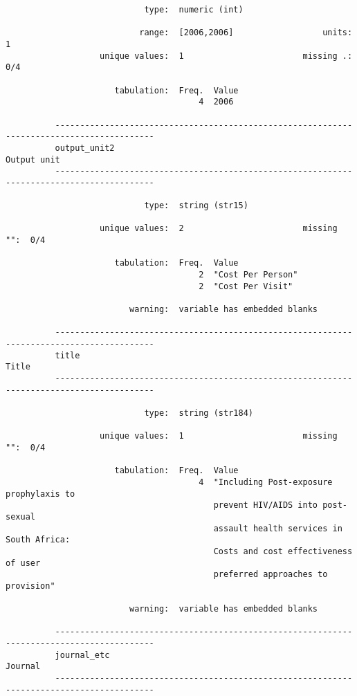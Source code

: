 \documentclass{article}
\begin{document}
\begin{verbatim}
                            type:  numeric (int)
          
                           range:  [2006,2006]                  units:  1
                   unique values:  1                        missing .:  0/4
          
                      tabulation:  Freq.  Value
                                       4  2006
          
          ------------------------------------------------------------------------------------------
          output_unit2                                                                   Output unit
          ------------------------------------------------------------------------------------------
          
                            type:  string (str15)
          
                   unique values:  2                        missing "":  0/4
          
                      tabulation:  Freq.  Value
                                       2  "Cost Per Person"
                                       2  "Cost Per Visit"
          
                         warning:  variable has embedded blanks
          
          ------------------------------------------------------------------------------------------
          title                                                                                Title
          ------------------------------------------------------------------------------------------
          
                            type:  string (str184)
          
                   unique values:  1                        missing "":  0/4
          
                      tabulation:  Freq.  Value
                                       4  "Including Post-exposure prophylaxis to
                                          prevent HIV/AIDS into post-sexual
                                          assault health services in South Africa:
                                          Costs and cost effectiveness of user
                                          preferred approaches to provision"
          
                         warning:  variable has embedded blanks
          
          ------------------------------------------------------------------------------------------
          journal_etc                                                                        Journal
          ------------------------------------------------------------------------------------------
          

\end{verbatim}
\end{document}
